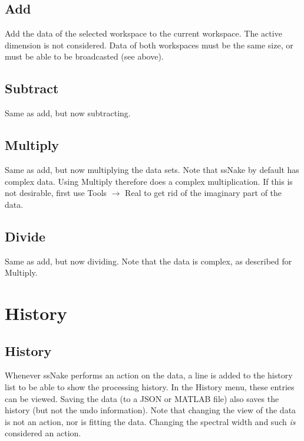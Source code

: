 \documentclass[11pt,a4paper]{article}
\begin{document}
\subsection{Add}
Add the data of the selected workspace to the current workspace. The active dimension is not considered. Data of both workspaces must be the same size, or must be able to be broadcasted (see above).


\subsection{Subtract}
Same as add, but now subtracting.

\subsection{Multiply}
Same as add, but now multiplying the data sets. Note that ssNake by default has complex data. Using Multiply therefore does a complex multiplication.
If this is not desirable, first use Tools $\rightarrow$ Real to get rid of the imaginary part of the data.

\subsection{Divide}
Same as add, but now dividing. Note that the data is complex, as described for Multiply.



\section{History}
\subsection{History}
Whenever ssNake performs an action on the data, a line is added to the history list to be able to show the processing history. In the History menu, these
entries can be viewed. Saving the data (to a JSON or MATLAB file) also saves the history (but not the undo information). Note that changing the view of the data
is not an action, nor is fitting the data. Changing the spectral width and such \textit{is} considered an action.
\end{document}
